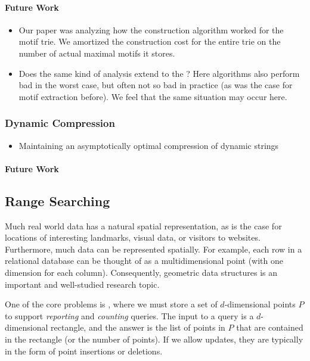 
\paragraph{Future Work}
\begin{itemize}
\item Our paper was analyzing how the construction algorithm worked for the motif trie. We amortized the construction cost for the entire trie on the number of actual maximal motifs it stores.
\item Does the same kind of analysis extend to the ? Here algorithms also perform bad in the worst case, but often not so bad in practice (as was the case for motif extraction before). We feel that the same situation may occur here.
\end{itemize}


\clearpage
\subsubsection{Dynamic Compression}

\begin{itemize}
    \item Maintaining an asymptotically optimal compression of dynamic strings
\end{itemize}

\paragraph{Future Work}



\clearpage
\subsection{Range Searching}
Much real world data has a natural spatial representation, as is the case for locations of interesting landmarks, visual data, or visitors to websites.
Furthermore, much data can be represented spatially. For example, each row in a relational database can be thought of as a multidimensional point (with one dimension for each column). Consequently, geometric data structures is an important and well-studied research topic. 

One of the core problems is , where we must store a set of $d$-dimensional points $P$ to support \emph{reporting} and \emph{counting} queries. The input to a query is a $d$-dimensional rectangle, and the answer is the list of points in $P$ that are contained in the rectangle (or the number of points). If we allow updates, they are typically in the form of point insertions or deletions. 

